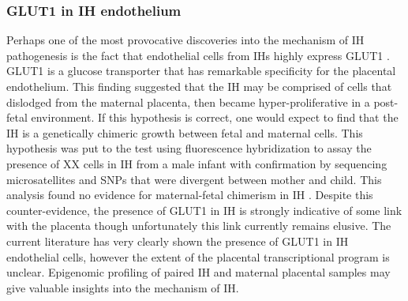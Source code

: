 \subsubsection{GLUT1 in IH endothelium}
Perhaps one of the most provocative discoveries into the mechanism of IH pathogenesis is the fact that endothelial cells from IHs highly express GLUT1 \citep{north2000, north2001}. GLUT1 is a glucose transporter that has remarkable specificity for the placental endothelium. This finding suggested that the IH may be comprised of cells that dislodged from the maternal placenta, then became hyper-proliferative in a post-fetal environment. If this hypothesis is correct, one would expect to find that the IH is a genetically chimeric growth between fetal and maternal cells. This hypothesis was put to the test using fluorescence  hybridization to assay the presence of XX cells in IH from a male infant with confirmation by sequencing microsatellites and SNPs that were divergent between mother and child. This analysis found no evidence for maternal-fetal chimerism in IH \citep{pittman2006}. Despite this counter-evidence, the presence of GLUT1 in IH is strongly indicative of some link with the placenta though unfortunately this link currently remains elusive. The current literature has very clearly shown the presence of GLUT1 in IH endothelial cells, however the extent of the placental transcriptional program is unclear. Epigenomic profiling of paired IH and maternal placental samples may give valuable insights into the mechanism of IH. 

